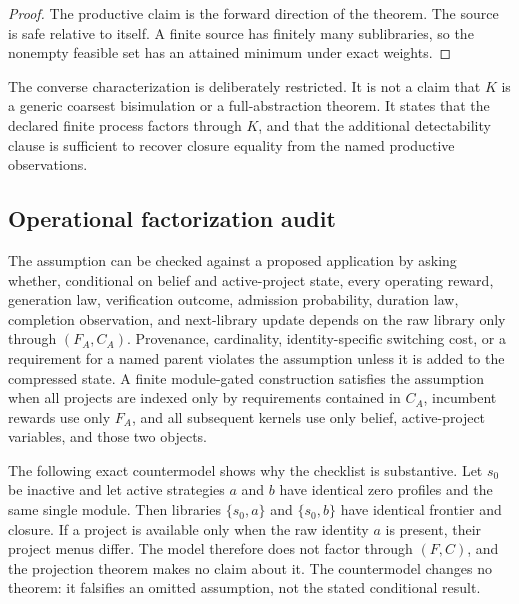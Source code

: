 \begin{proof}
The productive claim is the forward direction of the theorem. The source is
safe relative to itself. A finite source has finitely many sublibraries, so
the nonempty feasible set has an attained minimum under exact weights.
\end{proof}

The converse characterization is deliberately restricted. It is not a claim
that $K$ is a generic coarsest bisimulation or a full-abstraction theorem.
It states that the declared finite process factors through $K$, and that the
additional detectability clause is sufficient to recover closure equality
from the named productive observations.

\subsection{Operational factorization audit}

The assumption can be checked against a proposed application by asking whether,
conditional on belief and active-project state, every operating reward,
generation law, verification outcome, admission probability, duration law,
completion observation, and next-library update depends on the raw library only
through $(F_A,C_A)$. Provenance, cardinality, identity-specific switching cost,
or a requirement for a named parent violates the assumption unless it is added
to the compressed state. A finite module-gated construction satisfies the
assumption when all projects are indexed only by requirements contained in
$C_A$, incumbent rewards use only $F_A$, and all subsequent kernels use only
belief, active-project variables, and those two objects.

The following exact countermodel shows why the checklist is substantive. Let
$s_0$ be inactive and let active strategies $a$ and $b$ have identical zero
profiles and the same single module. Then libraries $\{s_0,a\}$ and
$\{s_0,b\}$ have identical frontier and closure. If a project is available only
when the raw identity $a$ is present, their project menus differ. The model
therefore does not factor through $(F,C)$, and the projection theorem makes no
claim about it. The countermodel changes no theorem: it falsifies an omitted
assumption, not the stated conditional result.

